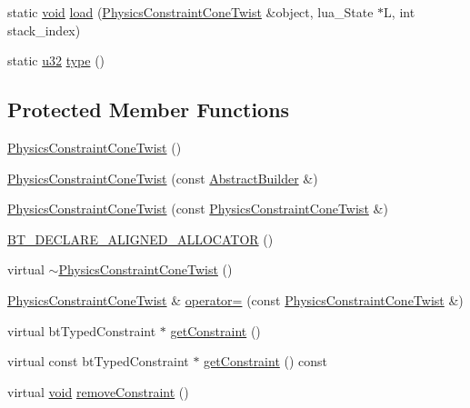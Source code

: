 \begin{DoxyCompactItemize}
\item 
static \mbox{\hyperlink{_thread_8h_af1e856da2e658414cb2456cb6f7ebc66}{void}} \mbox{\hyperlink{classnjli_1_1_physics_constraint_cone_twist_a3174e2995c524ac300bed364e4816080}{load}} (\mbox{\hyperlink{classnjli_1_1_physics_constraint_cone_twist}{Physics\+Constraint\+Cone\+Twist}} \&object, lua\+\_\+\+State $\ast$L, int stack\+\_\+index)
\item 
static \mbox{\hyperlink{_util_8h_a10e94b422ef0c20dcdec20d31a1f5049}{u32}} \mbox{\hyperlink{classnjli_1_1_physics_constraint_cone_twist_aee319aec49b4989f389054f69b0e522f}{type}} ()
\end{DoxyCompactItemize}
\subsection*{Protected Member Functions}
\begin{DoxyCompactItemize}
\item 
\mbox{\hyperlink{classnjli_1_1_physics_constraint_cone_twist_a947d157eba75740eb5ef4cd2a2d84fa7}{Physics\+Constraint\+Cone\+Twist}} ()
\item 
\mbox{\hyperlink{classnjli_1_1_physics_constraint_cone_twist_a6f984ff219ec12b993910004831aa06f}{Physics\+Constraint\+Cone\+Twist}} (const \mbox{\hyperlink{classnjli_1_1_abstract_builder}{Abstract\+Builder}} \&)
\item 
\mbox{\hyperlink{classnjli_1_1_physics_constraint_cone_twist_a691aaa4b2f4ea930445a8ee05d50f66b}{Physics\+Constraint\+Cone\+Twist}} (const \mbox{\hyperlink{classnjli_1_1_physics_constraint_cone_twist}{Physics\+Constraint\+Cone\+Twist}} \&)
\item 
\mbox{\hyperlink{classnjli_1_1_physics_constraint_cone_twist_a3c54783fbe28ac8b26ab032bc34a8418}{B\+T\+\_\+\+D\+E\+C\+L\+A\+R\+E\+\_\+\+A\+L\+I\+G\+N\+E\+D\+\_\+\+A\+L\+L\+O\+C\+A\+T\+OR}} ()
\item 
virtual \mbox{\hyperlink{classnjli_1_1_physics_constraint_cone_twist_adad948a62aa3f635cd06f1799c3a1312}{$\sim$\+Physics\+Constraint\+Cone\+Twist}} ()
\item 
\mbox{\hyperlink{classnjli_1_1_physics_constraint_cone_twist}{Physics\+Constraint\+Cone\+Twist}} \& \mbox{\hyperlink{classnjli_1_1_physics_constraint_cone_twist_a5eeb8731d6c64f9b37e00202f14fc9db}{operator=}} (const \mbox{\hyperlink{classnjli_1_1_physics_constraint_cone_twist}{Physics\+Constraint\+Cone\+Twist}} \&)
\item 
virtual bt\+Typed\+Constraint $\ast$ \mbox{\hyperlink{classnjli_1_1_physics_constraint_cone_twist_a50abadf06a0a68049c69a905cf09d1c7}{get\+Constraint}} ()
\item 
virtual const bt\+Typed\+Constraint $\ast$ \mbox{\hyperlink{classnjli_1_1_physics_constraint_cone_twist_a51dfe168c4b70ea71ce210079394b22b}{get\+Constraint}} () const
\item 
virtual \mbox{\hyperlink{_thread_8h_af1e856da2e658414cb2456cb6f7ebc66}{void}} \mbox{\hyperlink{classnjli_1_1_physics_constraint_cone_twist_a975d5736a7ef4c440f9138dfdfcec357}{remove\+Constraint}} ()
\end{DoxyCompactItemize}
